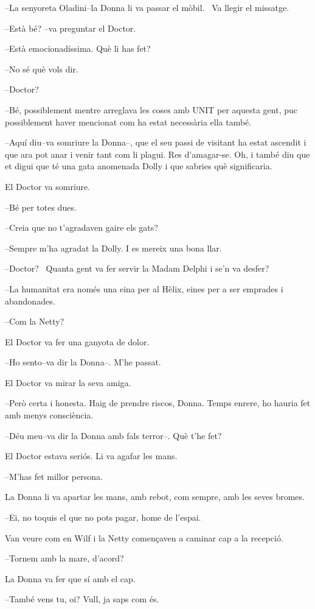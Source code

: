 --La senyoreta Oladini--la Donna li va passar el mòbil. ~Va llegir el
missatge.

--Està bé? --va preguntar el Doctor.

--Està emocionadíssima. Què li has fet?

--No sé què vols dir.

--Doctor?

--Bé, possiblement mentre arreglava les coses amb UNIT per aquesta gent,
puc possiblement haver mencionat com ha estat necessària ella també.

--Aquí diu--va somriure la Donna--, que el seu passi de visitant ha
estat ascendit i que ara pot anar i venir tant com li plagui. Res
d'amagar-se. Oh, i també diu que et digui que té una gata anomenada
Dolly i que sabries què significaria.

El Doctor va somriure.

--Bé per totes dues.

--Creia que no t'agradaven gaire els gats?

--Sempre m'ha agradat la Dolly. I es mereix una bona llar.

--Doctor? ~Quanta gent va fer servir la Madam Delphi i se'n va desfer?

--La humanitat era només una eina per al Hèlix, eines per a ser emprades
i abandonades.

--Com la Netty?

El Doctor va fer una ganyota de dolor.

--Ho sento--va dir la Donna--. M'he passat.

El Doctor va mirar la seva amiga.

--Però certa i honesta. Haig de prendre riscos, Donna. Temps enrere, ho
hauria fet amb menys consciència.

--Déu meu--va dir la Donna amb fals terror--. Què t'he fet?

El Doctor estava seriós. Li va agafar les mans.

--M'has fet millor persona.

La Donna li va apartar les mans, amb rebot, com sempre, amb les seves
bromes.

--Ei, no toquis el que no pots pagar, home de l'espai.

Van veure com en Wilf i la Netty començaven a caminar cap a la recepció.

--Tornem amb la mare, d'acord?

La Donna va fer que sí amb el cap.

--També vens tu, oi? Vull, ja saps com és.

